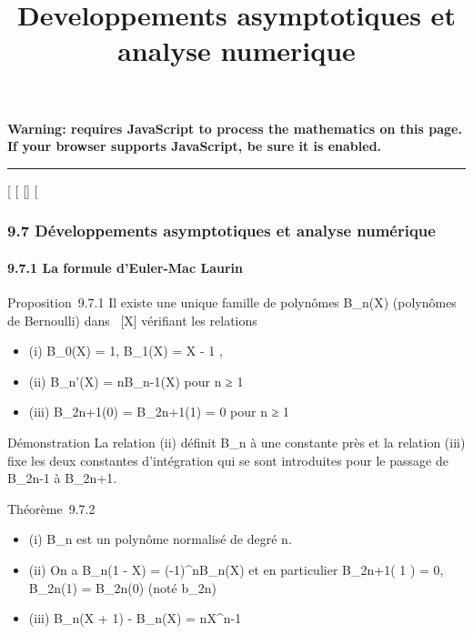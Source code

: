 \documentclass[]{article}
\title{Developpements asymptotiques et analyse numerique}
\author{}
\date{}
\begin{document}
\maketitle

\textbf{Warning: 
requires JavaScript to process the mathematics on this page.\\ If your
browser supports JavaScript, be sure it is enabled.}

\begin{center}\rule{3in}{0.4pt}\end{center}

{[}
{[}
{[}{]}
{[}

\subsubsection{9.7 Développements asymptotiques et analyse numérique}

\paragraph{9.7.1 La formule d'Euler-Mac Laurin}

Proposition~9.7.1 Il existe une unique famille de polynômes
B_n(X) (polynômes de Bernoulli) dans ~{[}X{]} vérifiant les
relations

\begin{itemize}
\itemsep1pt\parskip0pt
\item
  (i) B_0(X) = 1, B_1(X) = X - 1
   ,
\item
  (ii) B_n'(X) = nB_n-1(X) pour n ≥ 1
\item
  (iii) B_2n+1(0) = B_2n+1(1) = 0 pour n ≥ 1
\end{itemize}

Démonstration La relation (ii) définit B_n à une constante près
et la relation (iii) fixe les deux constantes d'intégration qui se sont
introduites pour le passage de B_2n-1 à B_2n+1.

Théorème~9.7.2

\begin{itemize}
\itemsep1pt\parskip0pt
\item
  (i) B_n est un polynôme normalisé de degré n.
\item
  (ii) On a B_n(1 - X) = (-1)^nB_n(X) et en
  particulier B_2n+1( 1  ) = 0,
  B_2n(1) = B_2n(0) (noté b_2n)
\item
  (iii) B_n(X + 1) - B_n(X) = nX^n-1
\end{itemize}
\end{document}
